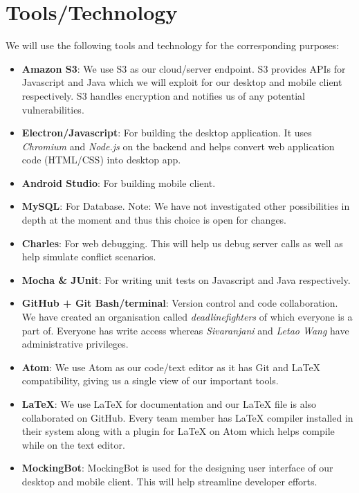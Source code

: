 \section{Tools/Technology}
We will use the following tools and technology for the corresponding purposes:
\begin{itemize}

\item \textbf{Amazon S3}: We use S3 as our cloud/server endpoint. S3 provides APIs for Javascript and Java which we will exploit for our desktop and mobile client respectively. S3 handles encryption and notifies us of any potential vulnerabilities.

\item \textbf{Electron/Javascript}: For building the desktop application. It uses \emph{Chromium} and \emph{Node.js} on the backend and helps convert web application code (HTML/CSS) into desktop app.

\item \textbf{Android Studio}: For building mobile client.

\item \textbf{MySQL}: For Database. Note: We have not investigated other possibilities in depth at the moment and thus this choice is open for changes.

\item \textbf{Charles}: For web debugging. This will help us debug server calls as well as help simulate conflict scenarios.

\item \textbf{Mocha \& JUnit}: For writing unit tests on Javascript and Java respectively.

\item \textbf{GitHub + Git Bash/terminal}: Version control and code collaboration. We have created an organisation called \emph{deadlinefighters} of which everyone is a part of. Everyone has write access whereas \emph{Sivaranjani} and \emph{Letao Wang} have administrative privileges.

\item \textbf{Atom}: We use Atom as our code/text editor as it has Git and {\LaTeX} compatibility, giving us a single view of our important tools.

\item \textbf{{\LaTeX}}: We use {\LaTeX} for documentation and our {\LaTeX} file is also collaborated on GitHub. Every team member has {\LaTeX} compiler installed in their system along with a plugin for {\LaTeX} on Atom which helps compile while on the text editor.

\item \textbf{MockingBot}: MockingBot is used for the designing user interface of our desktop and mobile client. This will help streamline developer efforts.

\end{itemize}
